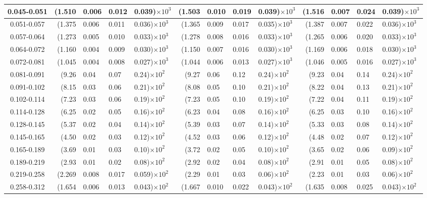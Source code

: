 \begin{table}[!htbp]
{\begin{tabular}{ | c | r@{$\pm$}l@{$\pm$}l@{$\pm$}l | r@{$\pm$}l@{$\pm$}l@{$\pm$}l | r@{$\pm$}l@{$\pm$}l@{$\pm$}l |}
0.045-0.051 & (1.510&0.006&0.012&0.039)$\times 10^{3}$ & (1.503&0.010&0.019&0.039)$\times 10^{3}$ & (1.516&0.007&0.024&0.039)$\times 10^{3}$ \\ \hline
0.051-0.057 & (1.375&0.006&0.011&0.036)$\times 10^{3}$ & (1.365&0.009&0.017&0.035)$\times 10^{3}$ & (1.387&0.007&0.022&0.036)$\times 10^{3}$ \\ \hline
0.057-0.064 & (1.273&0.005&0.010&0.033)$\times 10^{3}$ & (1.278&0.008&0.016&0.033)$\times 10^{3}$ & (1.265&0.006&0.020&0.033)$\times 10^{3}$ \\ \hline
0.064-0.072 & (1.160&0.004&0.009&0.030)$\times 10^{3}$ & (1.150&0.007&0.016&0.030)$\times 10^{3}$ & (1.169&0.006&0.018&0.030)$\times 10^{3}$ \\ \hline
0.072-0.081 & (1.045&0.004&0.008&0.027)$\times 10^{3}$ & (1.044&0.006&0.013&0.027)$\times 10^{3}$ & (1.046&0.005&0.016&0.027)$\times 10^{3}$ \\ \hline
0.081-0.091 & (9.26&0.04&0.07&0.24)$\times 10^{2}$ & (9.27&0.06&0.12&0.24)$\times 10^{2}$ & (9.23&0.04&0.14&0.24)$\times 10^{2}$ \\ \hline
0.091-0.102 & (8.15&0.03&0.06&0.21)$\times 10^{2}$ & (8.08&0.05&0.10&0.21)$\times 10^{2}$ & (8.22&0.04&0.13&0.21)$\times 10^{2}$ \\ \hline
0.102-0.114 & (7.23&0.03&0.06&0.19)$\times 10^{2}$ & (7.23&0.05&0.10&0.19)$\times 10^{2}$ & (7.22&0.04&0.11&0.19)$\times 10^{2}$ \\ \hline
0.114-0.128 & (6.25&0.02&0.05&0.16)$\times 10^{2}$ & (6.23&0.04&0.08&0.16)$\times 10^{2}$ & (6.25&0.03&0.10&0.16)$\times 10^{2}$ \\ \hline
0.128-0.145 & (5.37&0.02&0.04&0.14)$\times 10^{2}$ & (5.39&0.03&0.07&0.14)$\times 10^{2}$ & (5.33&0.03&0.08&0.14)$\times 10^{2}$ \\ \hline
0.145-0.165 & (4.50&0.02&0.03&0.12)$\times 10^{2}$ & (4.52&0.03&0.06&0.12)$\times 10^{2}$ & (4.48&0.02&0.07&0.12)$\times 10^{2}$ \\ \hline
0.165-0.189 & (3.69&0.01&0.03&0.10)$\times 10^{2}$ & (3.72&0.02&0.05&0.10)$\times 10^{2}$ & (3.65&0.02&0.06&0.09)$\times 10^{2}$ \\ \hline
0.189-0.219 & (2.93&0.01&0.02&0.08)$\times 10^{2}$ & (2.92&0.02&0.04&0.08)$\times 10^{2}$ & (2.91&0.01&0.05&0.08)$\times 10^{2}$ \\ \hline
0.219-0.258 & (2.269&0.008&0.017&0.059)$\times 10^{2}$ & (2.29&0.01&0.03&0.06)$\times 10^{2}$ & (2.23&0.01&0.03&0.06)$\times 10^{2}$ \\ \hline
0.258-0.312 & (1.654&0.006&0.013&0.043)$\times 10^{2}$ & (1.667&0.010&0.022&0.043)$\times 10^{2}$ & (1.635&0.008&0.025&0.043)$\times 10^{2}$ \\ \hline

\end{tabular}}
\end{table}
